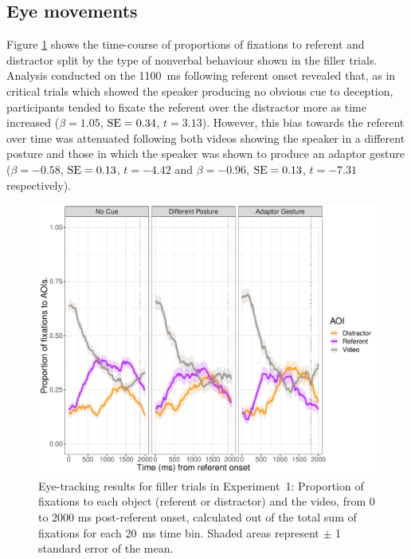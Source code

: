 \documentclass[a4paper,man,natbib]{apa6}
\newcommand{\resultsLM}[3]{$\beta = #1$, $\textnormal{SE} = #2$, $t #3$}
\begin{document}
\subsection{Eye movements}
Figure \ref{fig:v1_eye2} shows the time-course of proportions of fixations to referent and distractor split by the type of nonverbal behaviour shown in the filler trials. 
Analysis conducted on the 1100~ms following referent onset revealed that, as in critical trials which showed the speaker producing no obvious cue to deception, participants tended to fixate the referent over the distractor more as time increased (\resultsLM{1.05}{0.34}{=3.13}). 
However, this bias towards the referent over time was attenuated following both videos showing the speaker in a different posture and those in which the speaker was shown to produce an adaptor gesture (\resultsLM{-0.58}{0.13}{=-4.42} and \resultsLM{-0.96}{0.13}{=-7.31} respectively).



\begin{figure}[Ht]
  \centering
	\includegraphics[width=\linewidth]{./img/e7_fixations_filler.pdf}
  \caption{Eye-tracking results for filler trials in Experiment~1: Proportion of fixations to each object (referent or distractor) and the video, from 0 to 2000 ms post-referent onset, calculated out of the total sum of fixations for each 20~ms time bin. Shaded areas represent $\pm$ 1 standard error of the mean.}
  \label{fig:v1_eye2}
\end{figure}
\end{document}

